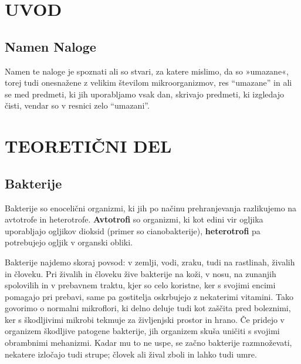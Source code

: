 \documentclass[12pt, a4paper, oneside]{report}
\begin{document}

\tableofcontents

\pagestyle{fancy}
\chead{}


\chapter{UVOD}

\section{Namen Naloge}

Namen te naloge je spoznati ali so stvari, za katere mislimo, da so »umazane«, torej tudi onesnažene z velikim številom mikroorganizmov, res ``umazane'' in ali se med predmeti, ki jih uporabljamo vsak dan, skrivajo predmeti, ki izgledajo čisti, vendar so v resnici zelo ``umazani''.

\chapter{TEORETIČNI DEL}

\section{Bakterije}

Bakterije so enocelični organizmi, ki jih po načinu prehranjevanja razlikujemo na avtotrofe in heterotrofe. \textbf{Avtotrofi} so organizmi, ki kot edini vir ogljika uporabljajo ogljikov dioksid (primer so cianobakterije), \textbf{heterotrofi} pa potrebujejo ogljik v organski obliki.

Bakterije najdemo skoraj povsod: v zemlji, vodi, zraku, tudi na rastlinah, živalih in človeku. Pri živalih in človeku žive bakterije na koži, v nosu, na zunanjih spolovilih in v prebavnem traktu, kjer so celo koristne, ker s svojimi encimi pomagajo pri prebavi, same pa gostitelja oskrbujejo z nekaterimi vitamini. Tako govorimo o normalni mikroflori, ki delno deluje tudi kot zaščita pred boleznimi, ker s škodljivimi mikrobi tekmuje za življenjski prostor in hrano. Če pridejo v organizem škodljive patogene bakterije, jih organizem skuša uničiti s svojimi obrambnimi mehanizmi. Kadar mu to ne uspe, se začno bakterije razmnoževati, nekatere izločajo tudi strupe; človek ali žival zboli in lahko tudi umre.
\end{document}
